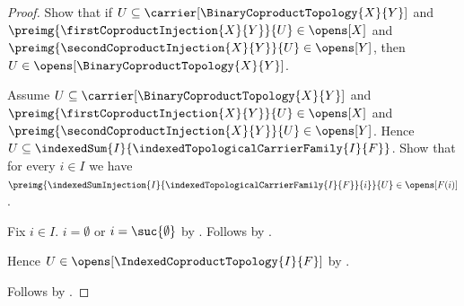 \begin{proof}
    Show that if
        $U\subseteq\carrier[\BinaryCoproductTopology{X}{Y}]$ and
        $\preimg{\firstCoproductInjection{X}{Y}}{U}\in\opens[X]$ and
        $\preimg{\secondCoproductInjection{X}{Y}}{U}\in\opens[Y]$, then
        $U\in\opens[\BinaryCoproductTopology{X}{Y}]$.
    \begin{subproof}
        Assume $U\subseteq\carrier[\BinaryCoproductTopology{X}{Y}]$ and
            $\preimg{\firstCoproductInjection{X}{Y}}{U}\in\opens[X]$ and
            $\preimg{\secondCoproductInjection{X}{Y}}{U}\in\opens[Y]$.
        Hence $U\subseteq\indexedSum{I}{
            \indexedTopologicalCarrierFamily{I}{F}}$.
        Show that for every $i\in I$ we have
            $\preimg{\indexedSumInjection{I}{
                \indexedTopologicalCarrierFamily{I}{F}}{i}}{U}
            \in\opens[F(i)]$.
        \begin{subproof}
            Fix $i\in I$.
            $i=\emptyset$ or $i=\suc{\emptyset}$ by
                .
            Follows by
                .
        \end{subproof}
        Hence $U\in\opens[\IndexedCoproductTopology{I}{F}]$ by
            .
    \end{subproof}
    Follows by \auto.
\end{proof}

